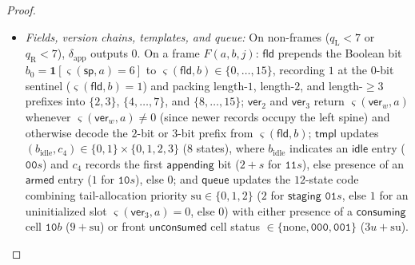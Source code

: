 \documentclass[11pt,reqno]{amsart}
\numberwithin{equation}{section}
\theoremstyle{plain}
\theoremstyle{definition}
\theoremstyle{remark}
\begin{document}
\begin{proof}
\begin{itemize}[leftmargin=2.0em]
  \item \emph{Fields, version chains, templates, and queue:} On non-frames ($q_{\mathrm{L}} < 7$ or $q_{\mathrm{R}} < 7$), $\delta_{\mathrm{app}}$ outputs $0$. On a frame $F(a, b, j)$: $\mathsf{fld}$ prepends the Boolean bit $b_0 = \mathbf{1}[\varsigma(\mathsf{sp}, a) = 6]$ to $\varsigma(\mathsf{fld}, b) \in \{0,\dots,15\}$, recording $1$ at the $0$-bit sentinel ($\varsigma(\mathsf{fld}, b) = 1$) and packing length-$1$, length-$2$, and length-$\ge 3$ prefixes into $\{2,3\}$, $\{4,\dots,7\}$, and $\{8,\dots,15\}$; $\mathsf{ver}_2$ and $\mathsf{ver}_3$ return $\varsigma(\mathsf{ver}_w, a)$ whenever $\varsigma(\mathsf{ver}_w, a) \ne 0$ (since newer records occupy the left spine) and otherwise decode the $2$-bit or $3$-bit prefix from $\varsigma(\mathsf{fld}, b)$; $\mathsf{tmpl}$ updates $(b_{\mathrm{idle}}, c_4) \in \{0,1\} \times \{0,1,2,3\}$ ($8$ states), where $b_{\mathrm{idle}}$ indicates an $\mathsf{idle}$ entry ($\mathtt{00}s$) and $c_4$ records the first $\mathsf{appending}$ bit ($2 + s$ for $\mathtt{11}s$), else presence of an $\mathsf{armed}$ entry ($1$ for $\mathtt{10}s$), else $0$; and $\mathsf{queue}$ updates the $12$-state code combining tail-allocation priority $\mathrm{su} \in \{0,1,2\}$ ($2$ for $\mathsf{staging}$ $\mathtt{01}s$, else $1$ for an uninitialized slot $\varsigma(\mathsf{ver}_3, a) = 0$, else $0$) with either presence of a $\mathsf{consuming}$ cell $\mathtt{10}b$ ($9 + \mathrm{su}$) or front $\mathsf{unconsumed}$ cell status $\in \{\text{none}, \mathtt{000}, \mathtt{001}\}$ ($3 u + \mathrm{su}$).

\end{itemize}
\end{proof}
\end{document}
